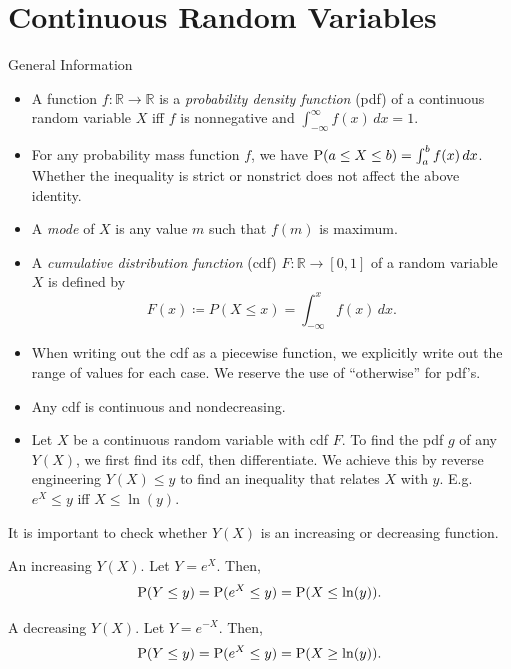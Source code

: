\chapter{Continuous Random Variables}
\begin{stbox}{General Information}
  \begin{itemize}
    \item A function \(f \colon \mathbb{R}\to \mathbb{R}\) is a \emph{probability density function} (pdf) of a continuous random variable \(X\) iff \(f\) is nonnegative and \(\int_{-\infty}^{\infty}f(x)\,dx=1\).
    \item For any probability mass function \(f\), we have \(\operatorname{P}(a\leq X\leq b)=\int_{a}^{b}f(x)\,dx\). Whether the inequality is strict or nonstrict does not affect the above identity. 
    \item A \emph{mode} of \(X\) is any value \(m\) such that \(f(m)\) is maximum.
    \item A \emph{cumulative distribution function} (cdf) \(F \colon \mathbb{R}\to [0,1]\) of a random variable \(X\) is defined by
    \[F(x)\coloneq P(X\leq x)=\int_{-\infty}^{x}f(x)\,dx.\]
    \item When writing out the cdf as a piecewise function, we explicitly write out the range of values for each case. We reserve the use of ``otherwise'' for pdf's.
    \item Any cdf is continuous and nondecreasing.
    \item Let \(X\) be a continuous random variable with cdf \(F\). To find the pdf \(g\) of any \(Y(X)\), we first find its cdf, then differentiate. We achieve this by reverse engineering \(Y(X)\leq y\) to find an inequality that relates \(X\) with \(y\). E.g. \(e^X\leq y\) iff \(X\leq \ln(y)\).
  \end{itemize}
\end{stbox}
\begin{note}
  It is important to check whether \(Y(X)\) is an increasing or decreasing function.
\end{note}
\begin{example}{An increasing \(Y(X)\).}{}
  Let \(Y=e^X\). Then,
  \[\operatorname{P}(Y\leq y)=\operatorname{P}(e^X\leq y)=\operatorname{P}(X\leq\ln(y)).\]
\end{example}
\begin{example}{A decreasing \(Y(X)\).}{}
  Let \(Y=e^{-X}\). Then,
  \[\operatorname{P}(Y\leq y)=\operatorname{P}(e^X\leq y)=\operatorname{P}(X\geq\ln(y)).\]
\end{example}
